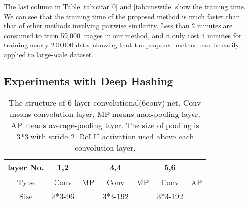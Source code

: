 \documentclass[conference]{IEEEtran}
\begin{document}
The last column in Table \ref{tab:cifar10} and \ref{tab:nuswide} show the training time. We can see that the training time of the proposed method is much faster than that of other methods involving pairwise similarity. Less than 2 minutes are consumed to train 59,000 images in our method, and it only cost 4 minutes for training nearly 200,000 data, showing that the proposed method can be easily applied to large-scale dataset.


\subsection{Experiments with Deep Hashing}
\label{subsec:deep}

\begin{table}[t]
    \centering
    \small
    \begin{tabular}{c|c|c|c|c|c|c}
    	\hline
    	layer No. & 1,2 & & 3,4 & & 5,6 & \\
        \hline
        Type & Conv & MP & Conv & MP & Conv & AP \\
        \hline
        Size & 3*3-96 & & 3*3-192 & & 3*3-192 & \\
        \hline
    \end{tabular}
    \caption{The structure of 6-layer convolutional(6conv) net. Conv means convolution layer, MP means max-pooling layer, AP means average-pooling layer. The size of pooling is 3*3 with stride 2. ReLU activation used above each convolution layer.}
    \label{tab:6conv}
\end{table}
\end{document}
